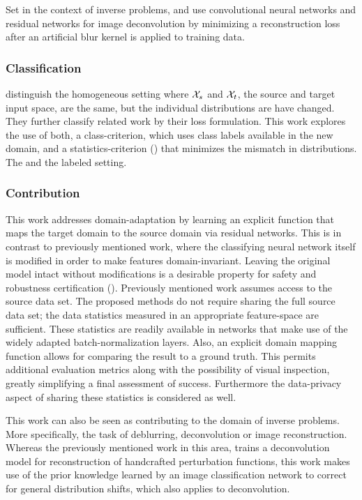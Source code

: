 Set in the context of inverse problems, 
\cite{IP_Deconv} and \cite{IP_VN} use convolutional neural networks 
and residual networks for image deconvolution by minimizing a reconstruction loss
after an artificial blur kernel is applied to training data.



\subsubsection{Classification}

\cite{DA_SURVEY} distinguish the homogeneous setting 
where $\mathcal X_s$ and $\mathcal X_t$, the source and target input space, are the same,
but the individual distributions are have changed.
They further classify related work by their loss formulation.
This work explores the use of both, a class-criterion,
which uses class labels available in the new domain, 
and a statistics-criterion (\cite{DA_SURVEY}) that minimizes 
the mismatch in distributions.
The and the labeled setting.

\subsubsection{Contribution}

This work addresses domain-adaptation by learning an explicit function 
that maps the 
target domain to the source domain via residual networks.
This is in contrast to previously mentioned work, 
where the classifying neural network itself is modified 
in order to make features domain-invariant.
Leaving the original model intact without modifications is a desirable property 
for safety and robustness certification (\cite{NEURIPS2019_f7fa6aca}).
Previously mentioned work assumes access to the source data set.
The proposed methods do not require sharing the full source data set;
the data statistics measured in an appropriate feature-space are sufficient.
These statistics are readily available in networks that make use of
the widely adapted batch-normalization layers.
Also, an explicit domain mapping function allows for
comparing the result to a ground truth.
This permits additional evaluation metrics along with the possibility of visual inspection,
greatly simplifying a final assessment of success.
Furthermore the data-privacy aspect of sharing these statistics
is considered as well.

This work can also be seen as contributing to the domain of inverse problems.
More specifically, the task of deblurring, deconvolution or image reconstruction.
Whereas the previously mentioned work in this area, 
trains a deconvolution model for
reconstruction of handcrafted perturbation functions, 
this work makes use of the prior knowledge
learned by an image classification network 
to correct for general distribution shifts, which also applies to deconvolution.

